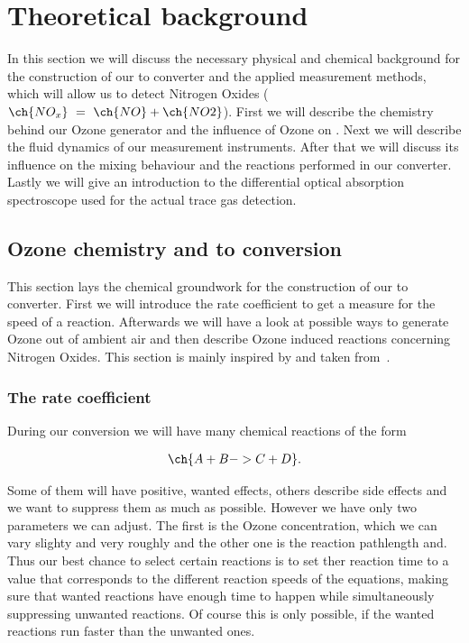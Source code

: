 \section{Theoretical background}
\label{sec:theory}

In this section we will discuss the necessary physical and chemical
background for the construction of our  to  converter
and the applied measurement methods, which will allow us to detect
Nitrogen Oxides ($\ch{NO_x}\ =\ \ch{NO} + \ch{NO2}$). First we will
describe the chemistry behind our Ozone generator and the influence of
Ozone on . Next we will describe the fluid dynamics of our
measurement instruments. After that we will discuss its influence on
the mixing behaviour and the reactions performed in our
converter. Lastly we will give an introduction to the differential
optical absorption spectroscope used for the actual trace gas
detection.

\subsection{Ozone chemistry and  to  conversion}
\label{sec:chemistry}

This section lays the chemical groundwork for the construction of our
 to  converter. First we will introduce the rate
coefficient to get a measure for the speed of a reaction. Afterwards
we will have a look at possible ways to generate Ozone out of ambient
air and then describe Ozone induced reactions concerning
Nitrogen Oxides. This section is mainly inspired by and taken
from~\cite{bsc}.

\subsubsection{The rate coefficient}
\label{sec:rate}

During our conversion we will have many chemical reactions of the form

\begin{align*}
  \ch{A + B -> C + D}.
\end{align*}

Some of them will have positive, wanted effects, others describe side
effects and we want to suppress them as much as possible. However we
have only two parameters we can adjust. The first is the Ozone
concentration, which we can vary slighty and very roughly and the
other one is the reaction pathlength and. Thus our best chance to
select certain reactions is to set ther reaction time to a value that
corresponds to the different reaction speeds of the equations, making
sure that wanted reactions have enough time to happen while
simultaneously suppressing unwanted reactions. Of
course this is only possible, if the wanted reactions run faster than
the unwanted ones.

